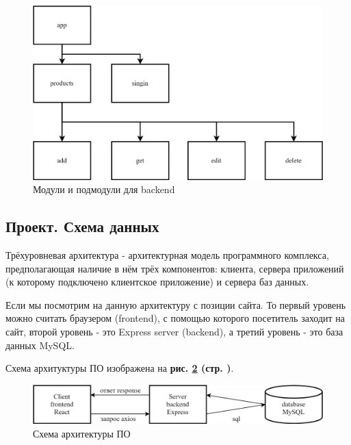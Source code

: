 \begin{figure}[!hp]
    \centering
    \includegraphics[width=16cm]
        {_assets/gpi_backend_modules.png}
    \caption{Модули и подмодули для backend}
    \label{fig:gpi_backend_modules}
\end{figure}

\newpage

\subsection{Проект. Схема данных}

Трёхуровневая архитектура - архитектурная модель программного комплекса,
предполагающая наличие в нём трёх компонентов: клиента, сервера приложений
(к которому подключено клиентское приложение) и сервера баз данных.

Если мы посмотрим на данную архитектуру с позиции сайта.
То первый уровень можно считать браузером (frontend), с помощью которого посетитель заходит на сайт,
второй уровень - это Express server (backend), а третий уровень - это база данных MySQL.

Схема архитуктуры ПО изображена на
\textbf{рис. \ref{fig:gpi_client_server} (стр. \pageref{fig:gpi_client_server})}.

\begin{figure}[!hp]
    \centering
    \includegraphics[width=16cm]
        {_assets/gpi_client_server.png}
    \caption{Схема архитектуры ПО}
    \label{fig:gpi_client_server}
\end{figure}

